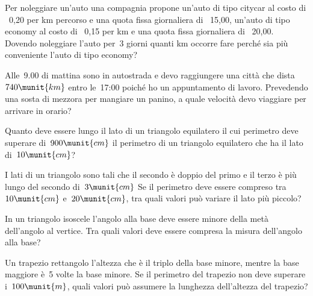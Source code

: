\begin{esercizio}[*]
\label{ese:21.26}
Per noleggiare un'auto una compagnia propone
un'auto di tipo citycar al costo di \officialeuro\ 0,20 per km percorso e 
una quota fissa giornaliera di \officialeuro\ 15,00,
un'auto di tipo economy al costo di \officialeuro\ 0,15
per km e una quota fissa giornaliera di \officialeuro\ 20,00. Dovendo
noleggiare l'auto per~3 giorni quanti km occorre fare
perché sia più conveniente l'auto di tipo economy?
\end{esercizio}

\begin{esercizio}
\label{ese:21.27}
Alle~9.00 di mattina sono in autostrada e devo raggiungere una città che 
dista~\(740\munit{km}\) entro le~17:00 poiché ho un appuntamento di lavoro.
Prevedendo una sosta di mezzora per mangiare un panino, a quale
velocità devo viaggiare per arrivare in orario?
\end{esercizio}

\begin{esercizio}[*]
\label{ese:21.28}
Quanto deve essere lungo il lato di un triangolo equilatero il cui
perimetro deve superare di~\(900\munit{cm}\) il perimetro di un triangolo
equilatero che ha il lato di~\(10\munit{cm}\)? 
\end{esercizio}

\begin{esercizio}[*]
\label{ese:21.29}
I lati di un triangolo sono tali che il secondo è doppio del primo e
il terzo è più lungo del secondo di~\(3\munit{cm}\) Se il perimetro deve
essere compreso tra~\(10\munit{cm}\) e~\(20\munit{cm}\), tra quali valori 
può variare 
il lato
più piccolo? 
\end{esercizio}

\begin{esercizio}[*]
\label{ese:21.30}
In un triangolo isoscele l'angolo
alla base deve essere minore della metà dell'angolo
al vertice. Tra quali valori deve essere compresa la misura
dell'angolo alla base? 
\end{esercizio}

\begin{esercizio}[*]
\label{ese:21.31}
Un trapezio rettangolo l'altezza che è il triplo
della base minore, mentre la base maggiore è~5 volte la base minore.
Se il perimetro del trapezio non deve superare i~\(100\munit{m}\), quali 
valori
può assumere la lunghezza dell'altezza del
trapezio? 
\end{esercizio}

